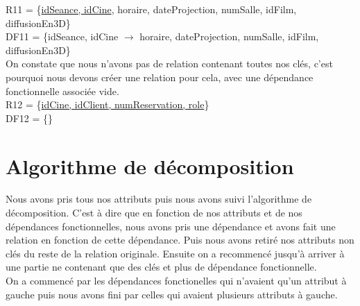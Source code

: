 \documentclass[a4paper,sffamily,12pt]{article}
\begin{document}
				\newpage 
				
				R11 = \{\underline{idSeance, idCine}, horaire, dateProjection, numSalle, idFilm, diffusionEn3D\} \\ DF11 = \{idSeance, idCine $\rightarrow$ horaire, dateProjection, numSalle, idFilm, diffusionEn3D\} \\
				
				On constate que nous n'avons pas de relation contenant toutes nos clés, c'est pourquoi nous devons créer une relation pour cela, avec une dépendance fonctionnelle associée vide.\\
											
				\noindent R12 = \{\underline{idCine, idClient, numReservation, role}\} \\ DF12 = \{\} \\

				\vspace{0.5cm}

		\section{Algorithme de décomposition}

			\vspace{0.5cm}
			
			Nous avons pris tous nos attributs puis nous avons suivi l'algorithme de décomposition. C'est à dire que en fonction de nos attributs et de nos dépendances fonctionnelles, nous avons pris une dépendance et avons fait une relation en fonction de cette dépendance. Puis nous avons retiré nos attributs non clés du reste de la relation originale. Ensuite on a recommencé jusqu'à arriver à une partie ne contenant que des clés et plus de dépendance fonctionnelle.\\
			\indent On a commencé par les dépendances fonctionelles qui n'avaient qu'un attribut à gauche puis nous avons fini par celles qui avaient plusieurs attributs à gauche.

		\newpage
		
\end{document}
